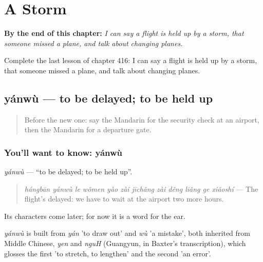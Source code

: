 
\chapter{A Storm}
\label{ch:zh-a-storm}

\begin{chapteropening}
\textbf{By the end of this chapter:} \emph{I can say a flight is held up by a storm, that someone missed a plane, and talk about changing planes.}

Complete the last lesson of chapter 416: I can say a flight is held up by a storm, that someone missed a plane, and talk about changing planes.
\end{chapteropening}

\section[yánwù]{yánwù — to be delayed; to be held up}

\label{lesson:ZH-C416-yanwu}



\begin{quote}
Before the new one: say the Mandarin for the security check at an airport, then the Mandarin for a departure gate.
\end{quote}

\subsection*{You'll want to know: yánwù}
\emph{yánwù} — \textquotedblleft{}to be delayed; to be held up\textquotedblright{}.

\begin{quote}
\emph{hángbān yánwù le wǒmen yào zài jīchǎng zài děng liǎng ge xiǎoshí} — The flight's delayed: we have to wait at the airport two more hours.
\end{quote}

Its characters come later; for now it is a word for the ear.

\begin{cousinweb}
\emph{yánwù} is built from \emph{yán} 'to draw out' and \emph{wù} 'a mistake', both inherited from Middle Chinese, \emph{yen} and \emph{nguH} (Guangyun, in Baxter's transcription), which glosses the first 'to stretch, to lengthen' and the second 'an error'.
\end{cousinweb}


